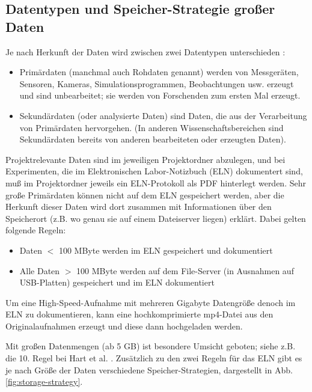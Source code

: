 \subsection{Datentypen und Speicher-Strategie großer Daten}
Je nach Herkunft der Daten wird zwischen zwei Datentypen unterschieden \cite{gitelman2013}:
\begin{itemize}
  \item Primärdaten (manchmal auch Rohdaten genannt) werden von Messgeräten,
        Sensoren, Kameras, Simulationsprogrammen, Beobachtungen usw. erzeugt
        und sind unbearbeitet; sie werden von Forschenden zum ersten Mal erzeugt.
  \item Sekundärdaten (oder analysierte Daten) sind Daten, die aus der
        Verarbeitung von Primärdaten hervorgehen. (In anderen
        Wissenschaftsbereichen sind Sekundärdaten bereits von anderen
        bearbeiteten oder erzeugten Daten).
\end{itemize}
Projektrelevante Daten sind im jeweiligen Projektordner abzulegen, und bei Experimenten, die im Elektronischen Labor-Notizbuch (ELN) dokumentert sind, muß im Projektordner jeweils ein ELN-Protokoll als PDF hinterlegt werden.
Sehr große Primärdaten können nicht auf dem ELN gespeichert werden, aber die Herkunft dieser Daten wird dort zusammen mit Informationen über den Speicherort (z.B. wo genau sie auf einem Dateiserver liegen) erklärt. Dabei gelten folgende Regeln:
\begin{itemize}
  \item Daten $<$ 100 MByte werden im ELN gespeichert und dokumentiert
  \item Alle Daten $>$ 100 MByte werden auf dem File-Server (in Ausnahmen auf USB-Platten) gespeichert und im
        ELN dokumentiert
\end{itemize}
Um eine High-Speed-Aufnahme mit mehreren Gigabyte Datengröße denoch im ELN zu dokumentieren, kann eine hochkomprimierte mp4-Datei aus den Originalaufnahmen erzeugt und diese dann hochgeladen werden.

Mit großen Datenmengen (ab 5 GB) ist besondere Umsicht geboten; siehe z.B. die 10. Regel bei Hart et al. \cite{hart:2016:PLOSComputBiol}. Zusätzlich zu den zwei Regeln für das ELN gibt es je nach Größe der Daten verschiedene Speicher-Strategien, dargestellt in Abb.\ref{fig:storage-strategy}.

